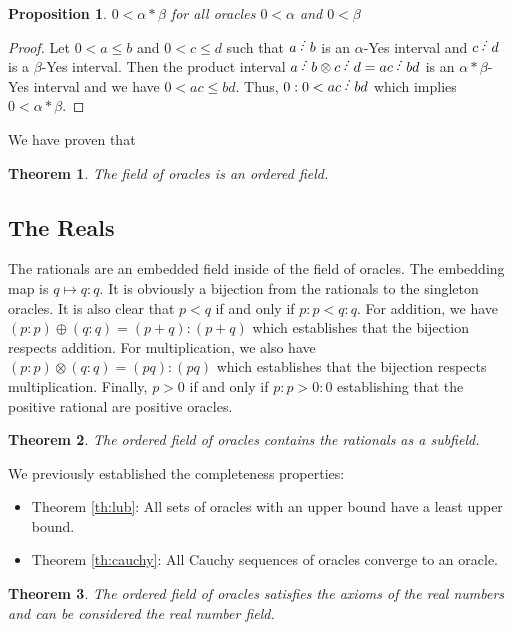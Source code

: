 \documentclass[12pt]{article}
\newtheorem{theorem}{Theorem}[subsection]
\newtheorem{proposition}{Proposition}[subsection]
\begin{document}
\begin{proposition}
$0 < \alpha*\beta$ for all oracles $0 < \alpha$ and $0< \beta$ 
\end{proposition}

\begin{proof}
Let $0 < a \leq b$ and $0<c \leq d$ such that $a\lte b$ is an $\alpha$-Yes interval and $c\lte d$ is a $\beta$-Yes interval. Then the product interval $a \lte b \otimes c \lte d = ac \lte bd$ is an $\alpha*\beta$-Yes interval and we have $0 < ac \leq bd$. Thus, $0:0 < ac \lte bd$ which implies $0 < \alpha*\beta$. 
\end{proof}

We have proven that

\begin{theorem}
The field of oracles is an ordered field.
\end{theorem}

\subsection{The Reals}

The rationals are an embedded field inside of the field of oracles. The embedding map is $q \mapsto q:q$. It is obviously a bijection from the rationals to the singleton oracles. It is also clear that $p<q$ if and only if $p:p < q:q$. For addition, we have $(p:p) \oplus (q:q) = (p+q):(p+q)$ which establishes that the bijection respects addition. For multiplication, we also have $(p:p) \otimes (q:q) = (pq):(pq)$ which establishes that the bijection respects multiplication.  Finally, $p>0$ if and only if $p:p > 0:0$ establishing that the positive rational are positive oracles. 

\begin{theorem}
The ordered field of oracles contains the rationals as a subfield. 
\end{theorem}

We previously established the completeness properties:

\begin{itemize}
    \item  Theorem \ref{th:lub}: All sets of oracles with an upper bound have a least upper bound. 
    \item Theorem \ref{th:cauchy}: All Cauchy sequences of oracles converge to an oracle. 
\end{itemize}

\begin{theorem}
The ordered field of oracles satisfies the axioms of the real numbers and can be considered the real number field. 
\end{theorem}
\end{document}
